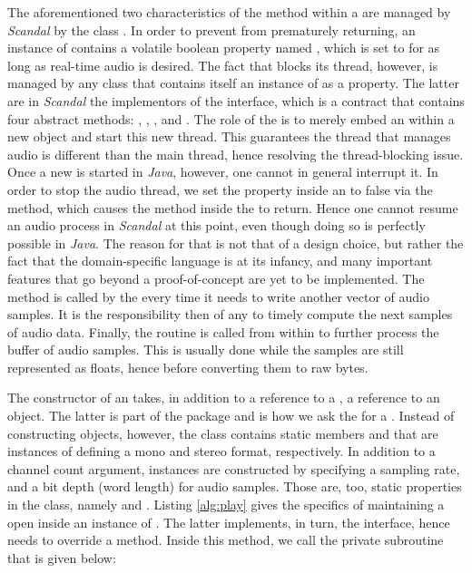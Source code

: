 The aforementioned two characteristics of the  method within a  are managed by \emph{Scandal} by the class . In order to prevent  from prematurely returning, an instance of  contains a volatile boolean property named , which is set to  for as long as real-time audio is desired. The fact that  blocks its thread, however, is managed by any class that contains itself an instance of  as a property. The latter are in \emph{Scandal} the implementors of the  interface, which is a contract that contains four abstract methods: , , , and . The role of the  is to merely embed an  within a new  object and start this new thread. This guarantees the thread that manages audio is different than the main  thread, hence resolving the thread-blocking issue. Once a new  is started in \emph{Java}, however, one cannot in general interrupt it. In order to stop the audio thread, we set the property  inside an  to false via the  method, which causes the  method inside the  to return. Hence one cannot resume an audio process in \emph{Scandal} at this point, even though doing so is perfectly possible in \emph{Java}. The reason for that is not that of a design choice, but rather the fact that the domain-specific language is at its infancy, and many important features that go beyond a proof-of-concept are yet to be implemented. The  method is called by the  every time it needs to write another vector of audio samples. It is the responsibility then of any  to timely compute the next  samples of audio data. Finally, the  routine is called from within  to further process the buffer of audio samples. This is usually done while the samples are still represented as floats, hence before converting them to raw bytes.

The constructor of an  takes, in addition to a reference to a , a reference to an  object. The latter is part of the  package and is how we ask the  for a . Instead of constructing  objects, however, the  class contains static members  and  that are instances of  defining a mono and stereo format, respectively. In addition to a channel count argument,  instances are constructed by specifying a sampling rate, and a bit depth (word length) for audio samples. Those are, too, static properties in the  class, namely  and . Listing \ref{alg:play} gives the specifics of maintaining a  open inside an instance of . The latter implements, in turn, the  interface, hence needs to override a  method. Inside this  method, we call the private  subroutine that is given below:

